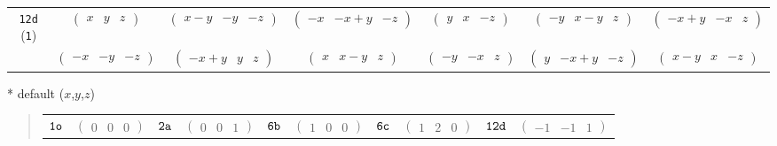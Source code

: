 \documentclass[fleqn,9pt,landscape]{jsarticle}
\begin{document}
\begin{center}
\begin{longtable}{ccccccc}
{\tt 12d} ({\tt 1}) & $ \begin{pmatrix} x & y & z \end{pmatrix} $ & $ \begin{pmatrix} x - y & - y & - z \end{pmatrix} $ & $ \begin{pmatrix} - x & - x + y & - z \end{pmatrix} $ & $ \begin{pmatrix} y & x & - z \end{pmatrix} $ & $ \begin{pmatrix} - y & x - y & z \end{pmatrix} $ & $ \begin{pmatrix} - x + y & - x & z \end{pmatrix} $ \\
& $ \begin{pmatrix} - x & - y & - z \end{pmatrix} $ & $ \begin{pmatrix} - x + y & y & z \end{pmatrix} $ & $ \begin{pmatrix} x & x - y & z \end{pmatrix} $ & $ \begin{pmatrix} - y & - x & z \end{pmatrix} $ & $ \begin{pmatrix} y & - x + y & - z \end{pmatrix} $ & $ \begin{pmatrix} x - y & x & - z \end{pmatrix} $ \\
\end{longtable}
\end{center}
* default ($x$,$y$,$z$)
\begin{quote}
\begin{tabular}{cccccccccc}
$ {\tt 1o} $ & $ \begin{pmatrix} 0 & 0 & 0 \end{pmatrix} $ & $ {\tt 2a} $ & $ \begin{pmatrix} 0 & 0 & 1 \end{pmatrix} $ & $ {\tt 6b} $ & $ \begin{pmatrix} 1 & 0 & 0 \end{pmatrix} $ & $ {\tt 6c} $ & $ \begin{pmatrix} 1 & 2 & 0 \end{pmatrix} $ & $ {\tt 12d} $ & $ \begin{pmatrix} -1 & -1 & 1 \end{pmatrix} $
\end{tabular}
\end{quote}
\end{document}
